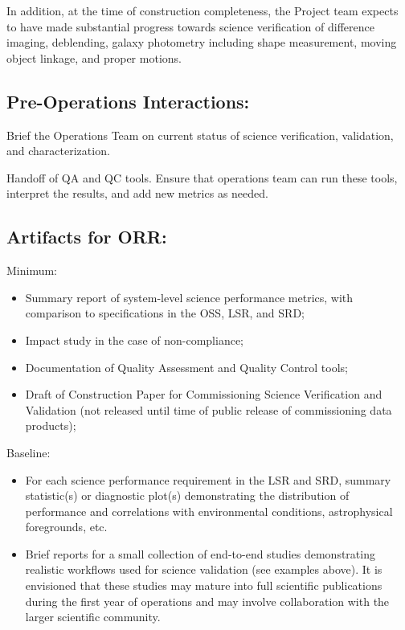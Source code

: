 In addition, at the time of construction completeness, the Project team expects to have made substantial progress towards science verification of difference imaging, deblending, galaxy photometry including shape measurement, moving object linkage, and proper motions.

\subsection{Pre-Operations Interactions:}

Brief the Operations Team on current status of science verification, validation, and characterization.

Handoff of QA and QC tools. Ensure that operations team can run these tools, interpret the results, and add new metrics as needed.

\subsection{Artifacts for ORR:}

Minimum:

\begin{itemize}
\item Summary report of system-level science performance metrics, with comparison to specifications in the OSS, LSR, and SRD;
\item Impact study in the case of non-compliance;
\item Documentation of Quality Assessment and Quality Control tools;
\item Draft of Construction Paper for Commissioning Science Verification and Validation (not released until time of public release of commissioning data products);
\end{itemize}

Baseline:

\begin{itemize}
\item For each science performance requirement in the LSR and SRD, summary statistic(s) or diagnostic plot(s) demonstrating the distribution of performance and correlations with environmental conditions, astrophysical foregrounds, etc.
\item Brief reports for a small collection of end-to-end studies demonstrating realistic workflows used for science validation (see examples above). It is envisioned that these studies may mature into full scientific publications during the first year of operations and may involve collaboration with the larger scientific community.
\end{itemize}
